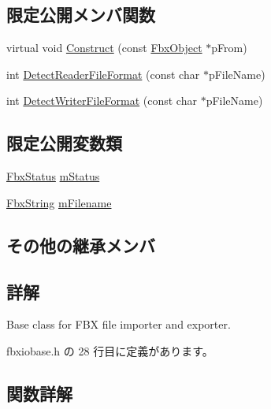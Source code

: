 \subsection*{限定公開メンバ関数}
\begin{DoxyCompactItemize}
\item 
virtual void \hyperlink{class_fbx_i_o_base_aed70ed1326f8fb1cc96e2086c73722f8}{Construct} (const \hyperlink{class_fbx_object}{Fbx\+Object} $\ast$p\+From)
\item 
int \hyperlink{class_fbx_i_o_base_aeeed7fece0297ede49ba8ceda58b2743}{Detect\+Reader\+File\+Format} (const char $\ast$p\+File\+Name)
\item 
int \hyperlink{class_fbx_i_o_base_ab33025566a08451ec2cffedfc1130ad4}{Detect\+Writer\+File\+Format} (const char $\ast$p\+File\+Name)
\end{DoxyCompactItemize}
\subsection*{限定公開変数類}
\begin{DoxyCompactItemize}
\item 
\hyperlink{class_fbx_status}{Fbx\+Status} \hyperlink{class_fbx_i_o_base_a7fd6efae8ba3697e4d242dc5412289aa}{m\+Status}
\item 
\hyperlink{class_fbx_string}{Fbx\+String} \hyperlink{class_fbx_i_o_base_a62dd6d12440a14577414ba18ed8dfa9f}{m\+Filename}
\end{DoxyCompactItemize}
\subsection*{その他の継承メンバ}


\subsection{詳解}
Base class for F\+BX file importer and exporter. 

 fbxiobase.\+h の 28 行目に定義があります。



\subsection{関数詳解}
\mbox{\label{class_fbx_i_o_base_aed70ed1326f8fb1cc96e2086c73722f8}} 
